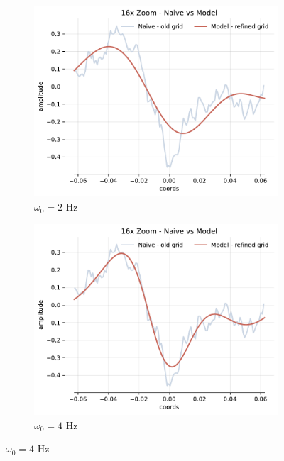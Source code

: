 \begin{figure}[h]
    \centering
    \begin{subfigure}[b]{0.32\textwidth}
        \centering
        \includegraphics[width=\textwidth]{img/ch4/16x-zoom-1hl-16hf-2hz.pdf}
        \caption{$\omega_0=2$ Hz}
    \end{subfigure}
    \begin{subfigure}[b]{0.32\textwidth}
        \centering
        \includegraphics[width=\textwidth]{img/ch4/16x_zoom-1hl-16hf-4hz.pdf}
        \caption{$\omega_0=4$ Hz}
    \end{subfigure}

\end{figure}
